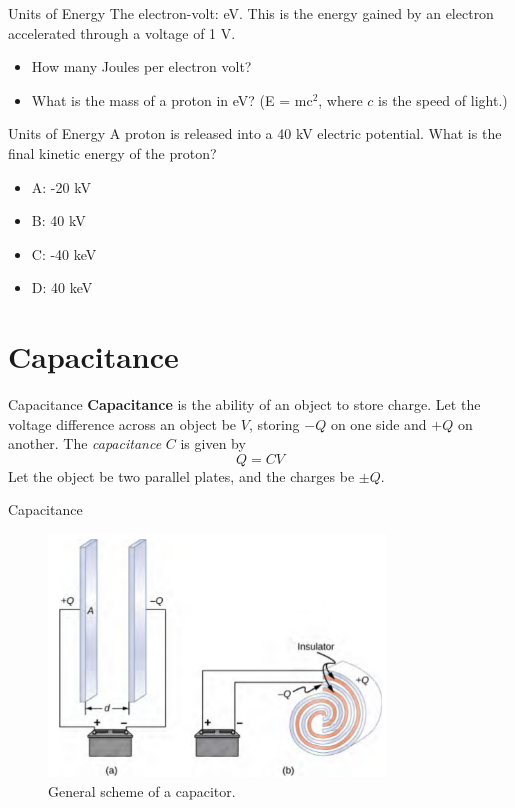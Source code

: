 \documentclass{beamer}
\begin{document}
\begin{frame}{Units of Energy}
The electron-volt: eV.  This is the energy gained by an electron accelerated through a voltage of 1 V.
\begin{itemize}
\item How many Joules per electron volt?
\item What is the mass of a proton in eV? (E = mc$^2$, where $c$ is the speed of light.)
\end{itemize}
\end{frame}

\begin{frame}{Units of Energy}
A proton is released into a 40 kV electric potential.  What is the final kinetic energy of the proton?
\begin{itemize}
\item A: -20 kV
\item B: 40 kV
\item C: -40 keV
\item D: 40 keV
\end{itemize}
\end{frame}

\section{Capacitance}

\begin{frame}{Capacitance}
\textbf{Capacitance} is the ability of an object to store charge.  Let the voltage difference across an object be $V$, storing $-Q$ on one side and $+Q$ on another.  The \textit{capacitance} $C$ is given by
\begin{equation}
Q = C V
\end{equation}
Let the object be two parallel plates, and the charges be $\pm Q$.
\end{frame}

\begin{frame}{Capacitance}
\begin{figure}
\centering
\includegraphics[width=0.8\textwidth]{figures/cap.png}
\caption{\label{fig:cap} General scheme of a capacitor.}
\end{figure}
\end{frame}
\end{document}
